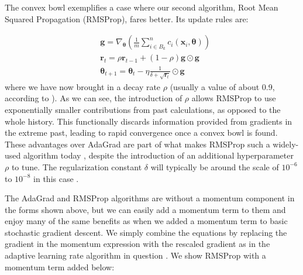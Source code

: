 The convex bowl exemplifies a case where our second algorithm, Root Mean Squared Propagation (RMSProp), fares better. Its update rules are:

\begin{align*}
    &\boldsymbol{g} = \nabla_{\boldsymbol{\theta}} \left ( \frac{1}{m} \sum_{i\in B_k}^n c_i (\boldsymbol{x}_i, \boldsymbol{\theta} ) \right )
    \\
    &\boldsymbol r_t = \rho \boldsymbol r_{t-1} + (1 -\rho)\boldsymbol{g} \odot \boldsymbol{g}
    \\
    &\boldsymbol{\theta}_{t+1} = \boldsymbol{\theta}_t - \eta \frac{1}{\delta + \sqrt{\boldsymbol r_t}} \odot \boldsymbol{g}
\end{align*}
 where we have now brought in a decay rate $\rho$ (usually a value of about 0.9, according to \textcite{MHJweek39}). As we can see, the introduction of $\rho$ allows RMSProp to use exponentially smaller contributions from past calculations, as opposed to the whole history. This functionally discards information provided from gradients in the extreme past, leading to rapid convergence once a convex bowl is found. These advantages over AdaGrad are part of what makes RMSProp such a widely-used algorithm today \cite{deeplearningbookChapter8}, despite the introduction of an additional hyperparameter $\rho$ to tune. The regularization constant $\delta$ will typically be around the scale of $10^{-6}$ to $10^{-8}$ in this case \cite{deeplearningbookChapter8} \cite{MHJweek39}.

The AdaGrad and RMSProp algorithms are without a momentum component in the forms shown above, but we can easily add a momentum term to them and enjoy many of the same benefits as when we added a momentum term to basic stochastic gradient descent. We simply combine the equations by replacing the gradient in the momentum expression with the rescaled gradient as in the adaptive learning rate algorithm in question \cite{deeplearningbookChapter8}. We show RMSProp with a momentum term added below: 

